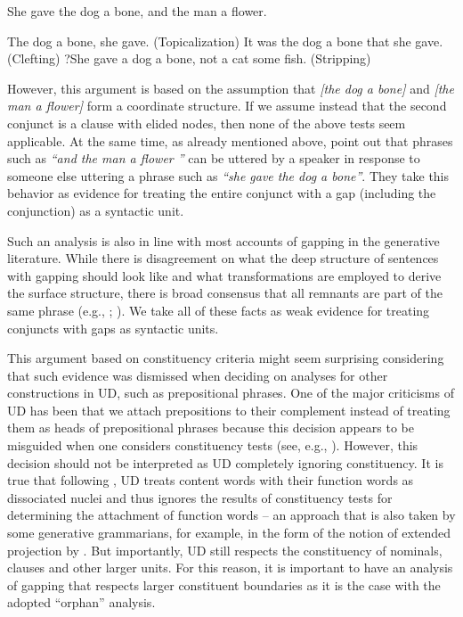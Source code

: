 \documentclass[11pt]{article}
\newcounter{excounter}
\begin{document}
\begin{exe}
\footnotesize
 \setcounter{xnumi}{\value{excounter}}
\ex \label{ex:osborne} She gave the dog a bone, and the man a flower.
\ex \label{ex:tests} \begin{xlist}
\ex *The dog a bone, she gave. (Topicalization)
\ex *It was the dog a bone that she gave. (Clefting)
\ex ?She gave a dog a bone, not a cat some fish. (Stripping)
\end{xlist}
\end{exe}

However, this argument is based on the assumption that \textit{[the dog a bone]} and \textit{[the man a flower]} form a coordinate structure. If we assume instead that the second conjunct is a clause with elided nodes, then none of the above tests seem applicable. At the same time, as already mentioned above,  point out that phrases such as \textit{``and the man a flower ''} can be uttered by a speaker in response to someone else uttering a phrase such as \textit{``she gave the dog a bone''}. They take this behavior as evidence for treating the entire conjunct with a gap (including the conjunction) as a syntactic unit. 

Such an analysis is also in line with most accounts of gapping in the generative literature. While there is disagreement on what the deep structure of sentences with gapping should look like and what transformations are employed to derive the surface structure, there is broad consensus that all remnants are part of the same phrase (e.g., ; ). We take all of these facts as weak evidence for treating conjuncts with gaps as syntactic units.

This argument based on constituency criteria might seem surprising considering that such evidence was dismissed when deciding on analyses for other constructions in UD, such as prepositional phrases. One of the major criticisms of UD has been  that we attach prepositions to their complement instead of treating them as heads of prepositional phrases because this decision appears to be misguided when one considers constituency tests (see, e.g., ). However, this decision should not be interpreted as UD completely ignoring constituency. It is true that following , UD treats content words with their function words as dissociated nuclei and thus ignores the results of constituency tests for determining the attachment of function words -- an approach that is also taken by some generative grammarians, for example, in the form of the notion of extended projection by . But importantly, UD still respects the constituency of nominals, clauses and other larger units. For this reason, it is important to have an analysis of gapping that respects larger constituent boundaries as it is the case with the adopted ``orphan'' analysis.
\end{document}
